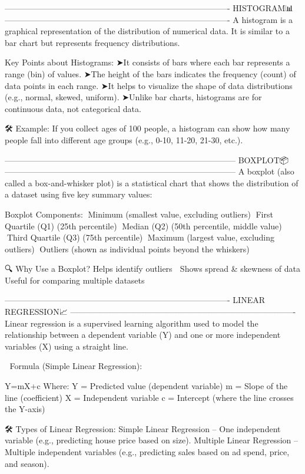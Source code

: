 ----------------------------------------------------------------------------------
HISTOGRAM📊
----------------------------------------------------------------------------------
A histogram is a graphical representation of the distribution of numerical data. It is similar to a bar chart but represents frequency distributions.

Key Points about Histograms:
➤It consists of bars where each bar represents a range (bin) of values.
➤The height of the bars indicates the frequency (count) of data points in each range.
➤It helps to visualize the shape of data distributions (e.g., normal, skewed, uniform).
➤Unlike bar charts, histograms are for continuous data, not categorical data.

🛠 Example:
If you collect ages of 100 people, a histogram can show how many people fall into different age groups (e.g., 0-10, 11-20, 21-30, etc.).

------------------------------------------------------------------------------------
BOXPLOT📦
------------------------------------------------------------------------------------
A boxplot (also called a box-and-whisker plot) is a statistical chart that shows the distribution of a dataset using five key summary values:

Boxplot Components:
🔸Minimum (smallest value, excluding outliers)
🔸First Quartile (Q1) (25th percentile)
🔸Median (Q2) (50th percentile, middle value)
🔸Third Quartile (Q3) (75th percentile)
🔸Maximum (largest value, excluding outliers)
🔸Outliers (shown as individual points beyond the whiskers)

🔍 Why Use a Boxplot?
Helps identify outliers 📌
Shows spread & skewness of data
Useful for comparing multiple datasets

----------------------------------------------------------------------------------
LINEAR REGRESSION📈
----------------------------------------------------------------------------------
Linear regression is a supervised learning algorithm used to model the relationship between a dependent variable (Y) and one or more independent variables (X) using a straight line.

🔢 Formula (Simple Linear Regression):

Y=mX+c
Where:
Y = Predicted value (dependent variable)
m = Slope of the line (coefficient)
X = Independent variable
c = Intercept (where the line crosses the Y-axis)

🛠 Types of Linear Regression:
Simple Linear Regression – One independent variable (e.g., predicting house price based on size).
Multiple Linear Regression – Multiple independent variables (e.g., predicting sales based on ad spend, price, and season).


